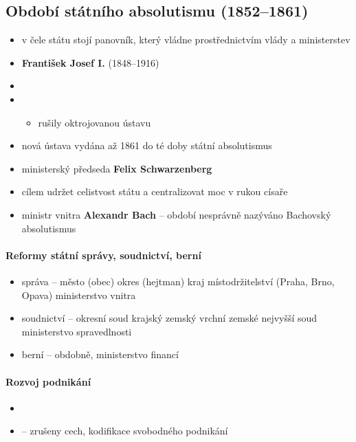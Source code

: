 \subsection{Období státního absolutismu (1852--1861)}
\begin{itemize}
\item v čele státu stojí panovník, který vládne prostřednictvím vlády a ministerstev
\item \textbf{František Josef I.} (1848--1916)
\item {}
\item {}
	\begin{itemize}
	\item rušily oktrojovanou ústavu
	\end{itemize}
\item nová ústava vydána až 1861 \ra do té doby státní absolutismus
\item ministerský předseda \textbf{Felix Schwarzenberg}
\item cílem udržet celistvost státu a centralizovat moc v rukou císaře
\item ministr vnitra \textbf{Alexandr Bach} -- období nesprávně nazýváno Bachovský absolutismus
\end{itemize}

\paragraph{Reformy státní správy, soudnictví, berní}
\begin{itemize}
\item správa -- město (obec) \ra okres (hejtman) \ra kraj \ra místodržitelství (Praha, Brno, Opava) \ra ministerstvo vnitra
\item soudnictví -- okresní soud \ra krajský \ra zemský \ra vrchní zemské \ra nejvyšší soud \ra ministerstvo spravedlnosti
\item berní -- obdobně, ministerstvo financí
\end{itemize}

\paragraph{Rozvoj podnikání}
\begin{itemize}
\item {}
\item {} -- zrušeny cech, kodifikace svobodného podnikání	
\end{itemize}

